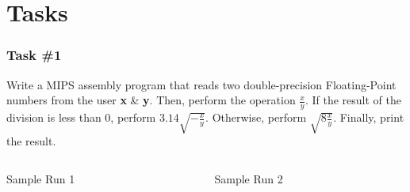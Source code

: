 \documentclass[
	11pt, %
]{beamer}
\begin{document}

\section{Tasks}

\begin{frame}
	\frametitle{Task \#1}
	\justifying
		Write a MIPS assembly program that reads two double-precision Floating-Point numbers from the user \textbf{x} \& \textbf{y}. 
		Then, perform the operation $\frac{x}{y}$. If the result of the division is less than 0, perform $ 3.14 \sqrt{-\frac{x}{y}} $. 
		Otherwise, perform $\sqrt{8\frac{x}{y}}$. Finally, print the result.
		\vspace{0.5cm}
	\begin{columns}[c]
		\begin{column}{0.5\textwidth}
			\centering
			Sample Run 1

		\end{column}
		\begin{column}{0.5\textwidth}
		\centering
			\centering
			Sample Run 2

			
		\end{column}
	\end{columns}
\end{frame}
\end{document}
